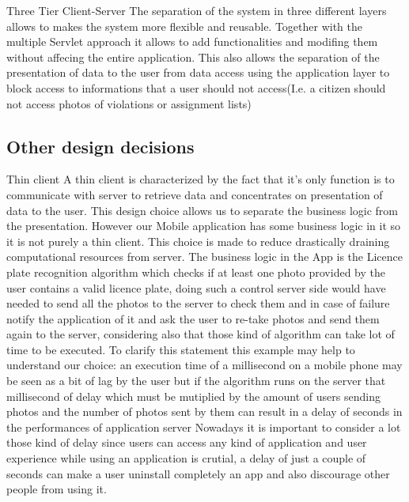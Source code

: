 Three Tier Client-Server
\newline
The separation of the system in three different layers allows to makes the system more flexible and reusable.
Together with the multiple Servlet approach it allows to add functionalities and modifing them without affecing the entire application.
This also allows the separation of the presentation of data to the user from data access using the application layer to block access to informations that a user should not access(I.e. a citizen should not access photos of violations or assignment lists)

\subsection{Other design decisions}
Thin client 
\newline
A thin client is characterized by the fact that it's only function is to communicate with server to retrieve data and concentrates on presentation of data to the user.
\newline
This design choice allows us to separate the business logic from the presentation. However our Mobile application has some business logic in it so it is not purely a thin client. This choice is made to reduce drastically draining computational resources from server. The business logic in the App is the Licence plate recognition algorithm which checks if at least one photo provided by the user contains a valid licence plate, doing such a control server side would have needed to send all the photos to the server to check them and in case of failure notify the application of it and ask the user to re-take photos and send them again to the server, considering also that those kind of algorithm can take lot of time to be executed.
To clarify this statement this example may help to understand our choice: an execution time of a millisecond on a mobile phone may be seen as a bit of lag by the user but if the algorithm runs on the server that millisecond of delay which must be mutiplied by the amount of users sending photos and the number of photos sent by them can result in a delay of seconds in the performances of application server
Nowadays it is important to consider a lot those kind of delay since users can access any kind of application and user experience while using an application is crutial, a delay of just a couple of seconds can make a user uninstall completely an app and also discourage other people from using it.










